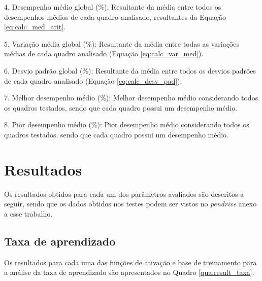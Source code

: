 \documentclass[12pt,oneside,a4paper,chapter=TITLE,section=TITLE,sumario
		=tradicional]{abntex2}
\begin{document}
\begin{lista}
			\item[4.] Desempenho médio global (\%): Resultante da média entre todos os desempenhos médios de cada quadro analisado, resultantes da Equação \ref{eq:calc_med_arit}.
			
			\item[5.] Variação média global (\%): Resultante da média entre todas as variações médias de cada quadro analisado (Equação \ref{eq:calc_var_med}).
			
			\item[6.] Desvio padrão global (\%): Resultante da média entre todos os desvios padrões de cada quadro analisado (Equação \ref{eq:calc_desv_pad}). 
			
			\item[7.] Melhor desempenho médio (\%): Melhor desempenho médio considerando todos os quadros testados, sendo que cada quadro possui um desempenho médio.
			
			\item[8.] Pior desempenho médio (\%): Pior desempenho médio considerando todos os quadros testados. sendo que cada quadro possui um desempenho médio.
		\end{lista}
		
		\section{Resultados}
		
		Os resultados obtidos para cada um dos parâmetros avaliados são descritos a seguir, sendo que os dados obtidos nos testes podem ser vistos no \textit{pendrive} anexo a esse trabalho.
		
		\subsection{Taxa de aprendizado}
		
		Os resultados para cada uma das funções de ativação e base de treinamento para a análise da taxa de aprendizado são apresentados no Quadro \ref{qua:result_taxa}.
		
\end{document}
